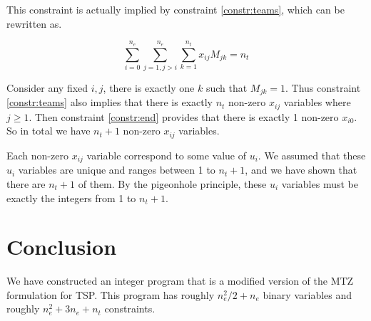 \documentclass[11pt]{article}
\begin{document}
This constraint is actually implied by constraint \eqref{constr:teams}, which can be rewritten as.

\begin{equation}
    \sum_{i=0}^{n_e} \sum_{j = 1, j > i}^{n_e} \sum_{k=1}^{n_t} x_{ij} M_{jk} = n_t
\end{equation}

Consider any fixed $i, j$, there is exactly one $k$ such that $M_{jk} = 1$. Thus constraint \eqref{constr:teams} also implies that there is exactly $n_t$ non-zero $x_{ij}$ variables where $j \geq 1$. Then constraint \eqref{constr:end} provides that there is exactly 1 non-zero $x_{i0}$. So in total we have $n_t + 1$ non-zero $x_{ij}$ variables.

Each non-zero $x_{ij}$ variable correspond to some value of $u_i$. We assumed that these $u_i$ variables are unique and ranges between 1 to $n_t + 1$, and we have shown that there are $n_t + 1$ of them. By the pigeonhole principle, these $u_i$ variables must be exactly the integers from 1 to $n_t + 1$.

\section{Conclusion}
We have constructed an integer program that is a modified version of the MTZ formulation for TSP. This program has roughly $n_e^2 / 2 + n_e$ binary variables and roughly $n_e^2 + 3n_e + n_t$ constraints.
\end{document}
